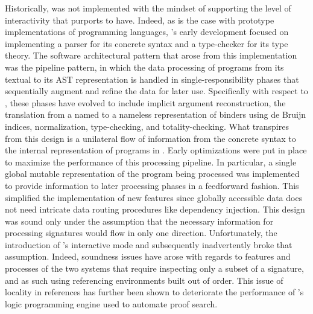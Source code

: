 Historically, \Beluga was not implemented with the mindset of supporting the level of interactivity that \Harpoon purports to have.
Indeed, as is the case with prototype implementations of programming languages, \Beluga's early development focused on implementing a parser for its concrete syntax and a type-checker for its type theory.
The software architectural pattern that arose from this implementation was the pipeline pattern, in which the data processing of programs from its textual to its \ac{AST} representation is handled in single-responsibility phases that sequentially augment and refine the data for later use.
Specifically with respect to \Beluga, these phases have evolved to include implicit argument reconstruction, the translation from a named to a nameless representation of binders using de Bruijn indices, normalization, type-checking, and totality-checking.
What transpires from this design is a unilateral flow of information from the concrete syntax to the internal representation of programs in \Beluga.
Early optimizations were put in place to maximize the performance of this processing pipeline.
In particular, a single global mutable representation of the \Beluga program being processed was implemented to provide information to later processing phases in a feedforward fashion.
This simplified the implementation of new features since globally accessible data does not need intricate data routing procedures like dependency injection.
This design was sound only under the assumption that the necessary information for processing \Beluga signatures would flow in only one direction.
Unfortunately, the introduction of \Beluga's interactive mode and subsequently \Harpoon inadvertently broke that assumption.
Indeed, soundness issues have arose with regards to features and processes of the two systems that require inspecting only a subset of a signature, and as such using referencing environments built out of order.
This issue of locality in references has further been shown to deteriorate the performance of \Beluga's logic programming engine used to automate proof search.



